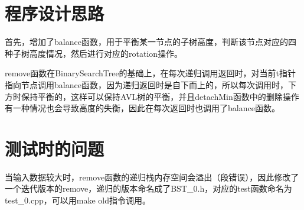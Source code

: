\documentclass[UTF8]{ctexart}
\begin{document}
\pagestyle{fancy}
\fancyhead{}
\rhead{\today}

\section{程序设计思路}
首先，增加了balance函数，用于平衡某一节点的子树高度，判断该节点对应的四种子树高度情况，然后进行对应的rotation操作。

remove函数在BinarySearchTree的基础上，在每次递归调用返回时，对当前t指针指向节点调用balance函数，因为递归返回时是自下而上的，所以每次调用时，下方时保持平衡的，这样可以保持AVL树的平衡，并且detachMin函数中的删除操作有一种情况也会导致高度的失衡，因此在每次返回时也调用了balance函数。



\section{测试时的问题}
当输入数据较大时，remove函数的递归栈内存空间会溢出（段错误），因此修改了一个迭代版本的remove，递归的版本命名成了BST\_0.h，对应的test函数命名为test\_0.cpp，可以用make old指令调用。
\end{document}
